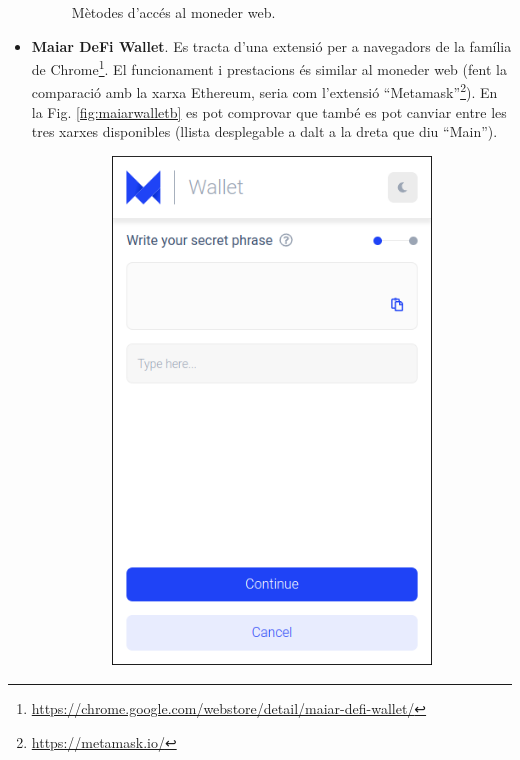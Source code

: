 \documentclass[11pt,a4paper]{article}
\begin{document}
\begin{itemize}
\begin{figure}[h]
\centering
\caption{Mètodes d'accés al moneder web.}\label{fig:webwallet}
\end{figure} 
\item \textbf{Maiar DeFi Wallet}. Es tracta d'una extensió per a navegadors de la família de Chrome\footnote{\url{https://chrome.google.com/webstore/detail/maiar-defi-wallet/}}. El funcionament i prestacions és similar al moneder web (fent la comparació amb la xarxa Ethereum, seria com l'extensió ``Metamask''\footnote{\url{https://metamask.io/}}). En la Fig. \ref{fig:maiarwalletb} es pot comprovar que també es pot canviar entre les tres xarxes disponibles (llista desplegable a dalt a la dreta que diu ``Main'').
\begin{figure}[!htb]
\begin{subfigure}[b]{0.4\textwidth}
  \includegraphics[width=\linewidth]{maiarextensio.png}

\end{subfigure}
\end{figure}
\end{itemize}
\end{document}

